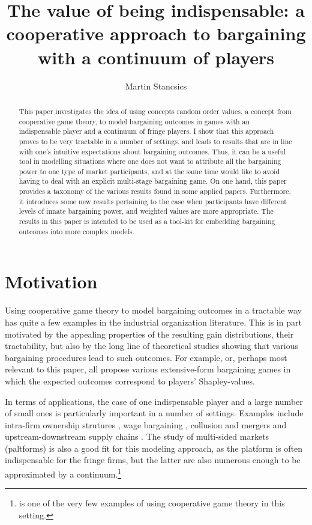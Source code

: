 \documentclass[a4paper]{article}
\title{The value of being indispensable: a cooperative approach to bargaining with a continuum of players}
\author{Martin Stancsics}
\begin{document}
\maketitle

\begin{abstract}
    This paper investigates the idea of using concepts random order values, a concept from cooperative game theory, to model bargaining outcomes in games with an indispensable player and a continuum of fringe players.
    I show that this approach proves to be very tractable in a number of settings, and leads to results that are in line with one's intuitive expectations about bargaining outcomes.
    Thus, it can be a useful tool in modelling situations where one does not want to attribute all the bargaining power to one type of market participants, and at the same time would like to avoid having to deal with an explicit multi-stage bargaining game.
    On one hand, this paper provides a taxonomy of the various results found in some applied papers.
    Furthermore, it introduces some new results pertaining to the case when participants have different levels of innate bargaining power, and weighted values are more appropriate.
    The results in this paper is intended to be used as a tool-kit for embedding bargaining outcomes into more complex models.
\end{abstract}


\section{Motivation}

Using cooperative game theory to model bargaining outcomes in a tractable way has quite a few examples in the industrial organization literature.
This is in part motivated by the appealing properties of the resulting gain distributions, their tractability, but also by the long line of theoretical studies showing that various bargaining procedures lead to such outcomes.
For example, \textcite{gul1989bargaining,winter1994demand,hart1996bargaining,inderst2003bargaining,} or, perhaps most relevant to this paper, \textcite{stole1996intra} all propose various extensive-form bargaining games in which the expected outcomes correspond to players' Shapley-values.

In terms of applications, the case of one indispensable player and a large number of small ones is particularly important in a number of settings.
Examples include intra-firm ownership strutures \parencite{hart1990property}, wage bargaining \parencite{stole1996intra,stole1996organizational,levy1997individual}, collusion and mergers \parencite{segal2003collusion} and upstream-downstream supply chains \parencite{inderst2003bargaining,montez2007downstream}.
The study of multi-sided markets (paltforms) is also a good fit for this modeling approach, as the platform is often indispensable for the fringe firms, but the latter are also numerous enough to be approximated by a continuum.\footnote{
    \textcite{huang2022shapley} is one of the very few examples of using cooperative game theory in this setting.
}
\end{document}
